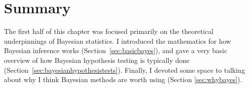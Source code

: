 \begin{comment}
Reading the results off this table is sort of counterintuitive, because you have to read off the answers from the ``wrong'' part of the table. For instance, the evidence for an effect of \rtext{drug} can be read from the column labelled \rtext{therapy}, which is pretty damned weird. To be fair to the authors of the package, I don't think they ever intended for the \rtext{anovaBF()} function to be used this way. My understanding\FOOTNOTE{Again, guys, sorry if I've misread you.} is that their view is simply that you should find the best model and report that model: there's no inherent reason why a Bayesian ANOVA should try to follow the exact same design as an orthodox ANOVA.\FOOTNOTE{I don't even disagree with them: it's {\it not} at all obvious why a Bayesian ANOVA should reproduce (say) the same set of model comparisons that the Type II testing strategy uses. It's precisely because of the fact that I haven't really come to any strong conclusions that I haven't added anything to the \rtext{lsr} package to make Bayesian Type II tests easier to produce.}

In any case, if you know what you're looking for, you can look at this table and then report the results of the Bayesian analysis in a way that is pretty closely analogous to how you'd report a regular Type II ANOVA. As I mentioned earlier, there's still no convention on how to do that, but I usually go for something like this:

\begin{quote}
A Bayesian Type II ANOVA found evidence for main effects of drug (Bayes factor: 954:1) and therapy (Bayes factor: 3:1), but no clear evidence for or against an interaction (Bayes factor: 1:1). 
\end{quote}



\end{comment}


\section{Summary}

The first half of this chapter was focused primarily on the theoretical underpinnings of Bayesian statistics. I introduced the mathematics for how Bayesian inference works (Section~\ref{sec:basicbayes}), and gave a very basic overview of how Bayesian hypothesis testing is typically done (Section~\ref{sec:bayesianhypothesistests}). Finally, I devoted some space to talking about why I think Bayesian methods are worth using (Section \ref{sec:whybayes}).


